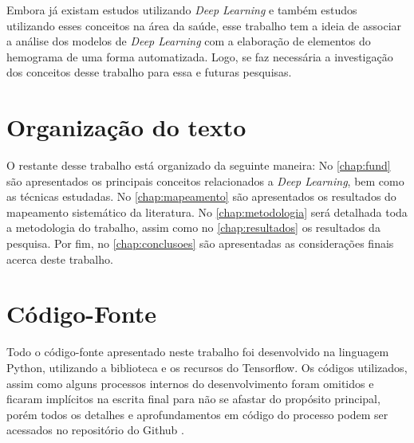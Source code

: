 Embora já existam estudos utilizando \emph{Deep Learning} e também estudos utilizando esses conceitos na área da saúde, esse trabalho tem a ideia de associar a análise dos modelos de \emph{Deep Learning} com a elaboração de elementos do hemograma de uma forma automatizada. Logo, se faz necessária a investigação dos conceitos desse trabalho para essa e futuras pesquisas.

\section{Organização do texto}
\label{sec:organizacao}
O restante desse trabalho está organizado da seguinte maneira: No \autoref{chap:fund} são apresentados os principais conceitos relacionados a \emph{Deep Learning}, bem como as técnicas estudadas. No \autoref{chap:mapeamento} são apresentados os resultados do mapeamento sistemático da literatura. No \autoref{chap:metodologia} será detalhada toda a metodologia do trabalho, assim como no \autoref{chap:resultados} os resultados da pesquisa. Por fim, no \autoref{chap:conclusoes} são apresentadas as considerações finais acerca deste trabalho.

\section{Código-Fonte}
Todo o código-fonte apresentado neste trabalho foi desenvolvido na linguagem Python, utilizando a biblioteca e os recursos do Tensorflow. Os códigos utilizados, assim como alguns processos internos do desenvolvimento foram omitidos e ficaram implícitos na escrita final para não se afastar do propósito principal, porém todos os detalhes e aprofundamentos em código do processo podem ser acessados no repositório do Github \cite{anthonyGithub}.